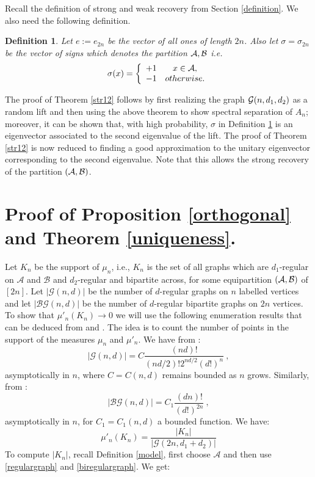 \documentclass[11pt,reqno]{amsart}
\newtheorem{definition}{Definition}
\begin{document}
Recall the definition of strong and weak recovery from Section \ref{definition}. We also  need the following definition. 
\begin{definition}\label{notlabel} Let $e:=e_{2n}$ be the vector of all ones of length $2n$. 
Also let $\sigma=\sigma_{2n}$ be the vector of signs which denotes the partition $\mathcal{A},\mathcal{B}$ i.e. 
$$\sigma(x)=\left\{\begin{array}{cc}
+1 & x \in \mathcal{A},\\
-1 & otherwise.
\end{array}\right.
$$
\end{definition}

The proof of Theorem \ref{str12} follows by first realizing the
graph $\mathcal{G}(n,d_1,d_2)$ as a random lift and then using the above
theorem to show spectral separation of $A_n$; moreover, it can be
shown that, with high probability, $\sigma$ in Definition \ref{notlabel} is an eigenvector associated to the second eigenvalue of the lift. The proof of Theorem \ref{str12} is now reduced to finding a good approximation to the unitary eigenvector corresponding to the second eigenvalue. Note that this allows the strong recovery of the partition $(\mathcal{A},\mathcal{B})$.



\section{Proof of Proposition \ref{orthogonal} and Theorem \ref{uniqueness}.} \label{ortho}
Let $K_{n}$ be the support of $\mu_n$, i.e., $K_n$ is the set of all graphs which
are $d_1$-regular on $\mathcal{A}$ and $\mathcal{B}$ and $d_2$-regular
and bipartite across, for some equipartition $(\mathcal{A}, \mathcal{B})$ of $[2n]$.
Let $|\mathcal{G}(n,d)|$  be the number of $d$-regular graphs on $n$ labelled vertices and let $|\mathcal{BG}(n,d)|$ be the number of $d$-regular bipartite graphs on $2n$ vertices. 
To show that $\mu'_n(K_n)\to 0$ we will use the following enumeration results that can be deduced from \cite{MWa03} and \cite{mckay1991asymptotic}. The idea is to count the number of points in the support of the measures $\mu_n$ and $\mu'_n$.
\noindent
We have from \cite[Corollary 5.3]{mckay1991asymptotic} :
\begin{equation}\label{regulargraph}
|\mathcal{G}(n,d)|=C \frac{(nd)!}{(nd/2)!2^{nd/2}(d!)^n}~,
\end{equation}
asymptotically in $n$, where $C=C(n,d)$ remains bounded as $n$ grows. Similarly, from \cite[Theorem 2]{MWa03}:
\begin{equation}\label{biregulargraph}
|\mathcal{BG}(n,d)|=C_1 \frac{(dn)!}{(d!)^{2n}}~,
\end{equation}
asymptotically in $n$, for $C_1=C_1(n,d)$ a bounded function. We have:
\[
\mu'_n(K_n)=\frac{|K_n|}{|\mathcal{G}(2n,d_1+d_2)|}
\]
To compute $|K_n|$, recall Definition \ref{model}, first choose $\mathcal{A}$ and then use \eqref{regulargraph} and \eqref{biregulargraph}. We get: 
\end{document}
